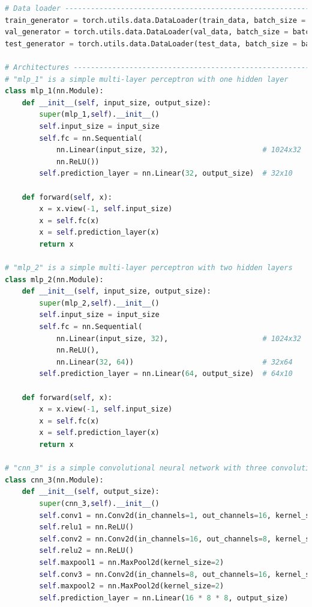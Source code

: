 \documentclass[3p,times,procedia]{elsarticle}
\begin{document}
\begin{lstlisting}[language=Python]
# Data loader ----------------------------------------------------------------------------------------------------------------------------------------#
train_generator = torch.utils.data.DataLoader(train_data, batch_size = batch_size, shuffle = True)
val_generator = torch.utils.data.DataLoader(val_data, batch_size = batch_size )
test_generator = torch.utils.data.DataLoader(test_data, batch_size = batch_size ) 

# Architectures ---------------------------------------------------------------------------------------------------------------------------------------#
# "mlp_1" is a simple multi-layer perceptron with one hidden layer
class mlp_1(nn.Module):
    def __init__(self, input_size, output_size):
        super(mlp_1,self).__init__()
        self.input_size = input_size
        self.fc = nn.Sequential(
            nn.Linear(input_size, 32),                      # 1024x32
            nn.ReLU())                                      
        self.prediction_layer = nn.Linear(32, output_size)  # 32x10
    
    def forward(self, x):
        x = x.view(-1, self.input_size)
        x = self.fc(x)
        x = self.prediction_layer(x)
        return x
    
# "mlp_2" is a simple multi-layer perceptron with two hidden layers
class mlp_2(nn.Module):
    def __init__(self, input_size, output_size):
        super(mlp_2,self).__init__()
        self.input_size = input_size
        self.fc = nn.Sequential(
            nn.Linear(input_size, 32),                      # 1024x32
            nn.ReLU(),
            nn.Linear(32, 64))                              # 32x64
        self.prediction_layer = nn.Linear(64, output_size)  # 64x10
    
    def forward(self, x):
        x = x.view(-1, self.input_size)
        x = self.fc(x)
        x = self.prediction_layer(x)
        return x
    
# "cnn_3" is a simple convolutional neural network with three convolutional layers
class cnn_3(nn.Module):
    def __init__(self, output_size):
        super(cnn_3,self).__init__()
        self.conv1 = nn.Conv2d(in_channels=1, out_channels=16, kernel_size=3, padding=1)  # 1x32x32 -> 16x32x32
        self.relu1 = nn.ReLU()
        self.conv2 = nn.Conv2d(in_channels=16, out_channels=8, kernel_size=5, padding=2)  # 16x32x32 -> 8x32x32
        self.relu2 = nn.ReLU()
        self.maxpool1 = nn.MaxPool2d(kernel_size=2)                                       # 8x32x32 -> 8x16x16                        
        self.conv3 = nn.Conv2d(in_channels=8, out_channels=16, kernel_size=7, padding=3)  # 8x16x16 -> 16x16x16
        self.maxpool2 = nn.MaxPool2d(kernel_size=2)                                       # 16x16x16 -> 16x8x8
        self.prediction_layer = nn.Linear(16 * 8 * 8, output_size)                        # 16x8x8 -> 10


\end{lstlisting}
\end{document}
